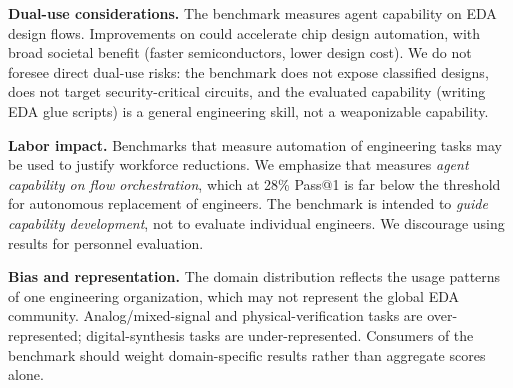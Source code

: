 \textbf{Dual-use considerations.} The benchmark measures agent capability on EDA design flows. Improvements on \bench{} could accelerate chip design automation, with broad societal benefit (faster semiconductors, lower design cost). We do not foresee direct dual-use risks: the benchmark does not expose classified designs, does not target security-critical circuits, and the evaluated capability (writing EDA glue scripts) is a general engineering skill, not a weaponizable capability.

\textbf{Labor impact.} Benchmarks that measure automation of engineering tasks may be used to justify workforce reductions. We emphasize that \bench{} measures \emph{agent capability on flow orchestration}, which at 28\% Pass@1 is far below the threshold for autonomous replacement of engineers. The benchmark is intended to \emph{guide capability development}, not to evaluate individual engineers. We discourage using \bench{} results for personnel evaluation.

\textbf{Bias and representation.} The domain distribution reflects the usage patterns of one engineering organization, which may not represent the global EDA community. Analog/mixed-signal and physical-verification tasks are over-represented; digital-synthesis tasks are under-represented. Consumers of the benchmark should weight domain-specific results rather than aggregate scores alone.
